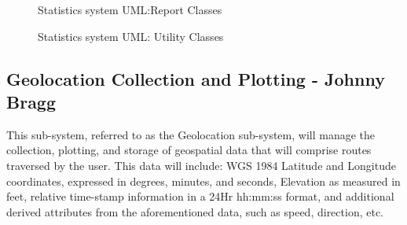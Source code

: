 \documentclass{article}
\begin{document}
\begin{figure}[H]
    \centering
    \begin{center}
    \end{center}
    \caption{Statistics system UML:Report Classes}
    \label{fig:my_label}
\end{figure}
\begin{figure}[H]
    \centering
    \begin{center}
    \end{center}
    \caption{Statistics system UML: Utility Classes}
    \label{fig:my_label}
\end{figure}
\pagebreak

\subsection{Geolocation Collection and Plotting - Johnny Bragg}
This sub-system, referred to as the Geolocation sub-system, will manage the collection, plotting, and storage of geospatial data that will comprise routes traversed by the user. This data will include: WGS 1984 Latitude and Longitude coordinates, expressed in degrees, minutes, and seconds, Elevation as measured in feet, relative time-stamp information in a 24Hr hh:mm:ss format, and additional derived attributes from the aforementioned data, such as speed, direction, etc.
\end{document}
